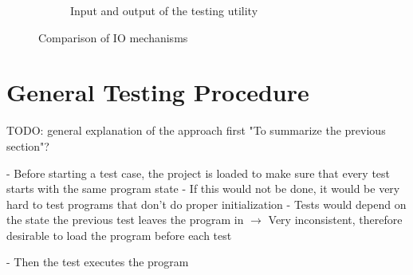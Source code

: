 \begin{figure}[h]
\begin{subfigure}[b]{\textwidth}
        \caption{Input and output of the testing utility}
        \label{fig:input_and_output_of_the_testing utility}
    \end{subfigure}

    \caption{Comparison of IO mechanisms}
    \label{fig:comparison_of_io_mechanisms}
\end{figure}

\section{General Testing Procedure}

TODO: general explanation of the approach first
"To summarize the previous section"?

- Before starting a test case, the project is loaded to make sure that every test starts with the same program state
    - If this would not be done, it would be very hard to test programs that don't do proper initialization
    - Tests would depend on the state the previous test leaves the program in
    $\rightarrow$ Very inconsistent, therefore desirable to load the program before each test

- Then the test executes the program

